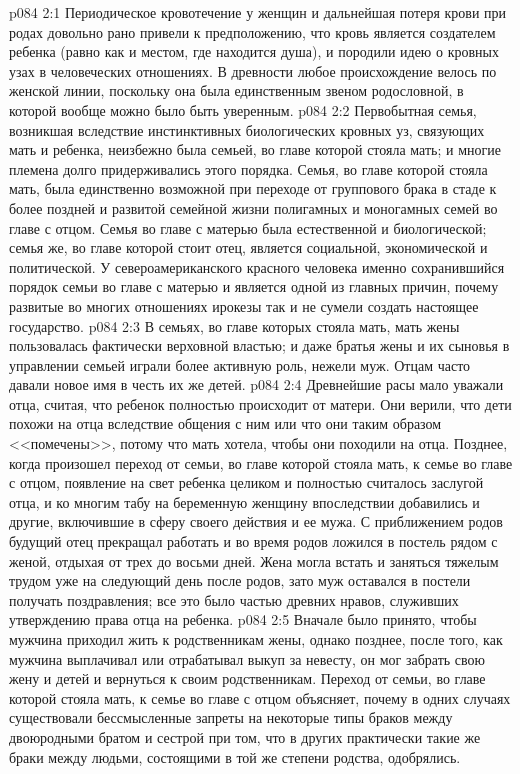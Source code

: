 \vs p084 2:1 Периодическое кровотечение у женщин и дальнейшая потеря крови при родах довольно рано привели к предположению, что кровь является создателем ребенка (равно как и местом, где находится душа), и породили идею о кровных узах в человеческих отношениях. В древности любое происхождение велось по женской линии, поскольку она была единственным звеном родословной, в которой вообще можно было быть уверенным.
\vs p084 2:2 Первобытная семья, возникшая вследствие инстинктивных биологических кровных уз, связующих мать и ребенка, неизбежно была семьей, во главе которой стояла мать; и многие племена долго придерживались этого порядка. Семья, во главе которой стояла мать, была единственно возможной при переходе от группового брака в стаде к более поздней и развитой семейной жизни полигамных и моногамных семей во главе с отцом. Семья во главе с матерью была естественной и биологической; семья же, во главе которой стоит отец, является социальной, экономической и политической. У североамериканского красного человека именно сохранившийся порядок семьи во главе с матерью и является одной из главных причин, почему развитые во многих отношениях ирокезы так и не сумели создать настоящее государство.
\vs p084 2:3 В семьях, во главе которых стояла мать, мать жены пользовалась фактически верховной властью; и даже братья жены и их сыновья в управлении семьей играли более активную роль, нежели муж. Отцам часто давали новое имя в честь их же детей.
\vs p084 2:4 Древнейшие расы мало уважали отца, считая, что ребенок полностью происходит от матери. Они верили, что дети похожи на отца вследствие общения с ним или что они таким образом <<помечены>>, потому что мать хотела, чтобы они походили на отца. Позднее, когда произошел переход от семьи, во главе которой стояла мать, к семье во главе с отцом, появление на свет ребенка целиком и полностью считалось заслугой отца, и ко многим табу на беременную женщину впоследствии добавились и другие, включившие в сферу своего действия и ее мужа. С приближением родов будущий отец прекращал работать и во время родов ложился в постель рядом с женой, отдыхая от трех до восьми дней. Жена могла встать и заняться тяжелым трудом уже на следующий день после родов, зато муж оставался в постели получать поздравления; все это было частью древних нравов, служивших утверждению права отца на ребенка.
\vs p084 2:5 Вначале было принято, чтобы мужчина приходил жить к родственникам жены, однако позднее, после того, как мужчина выплачивал или отрабатывал выкуп за невесту, он мог забрать свою жену и детей и вернуться к своим родственникам. Переход от семьи, во главе которой стояла мать, к семье во главе с отцом объясняет, почему в одних случаях существовали бессмысленные запреты на некоторые типы браков между двоюродными братом и сестрой при том, что в других практически такие же браки между людьми, состоящими в той же степени родства, одобрялись.
